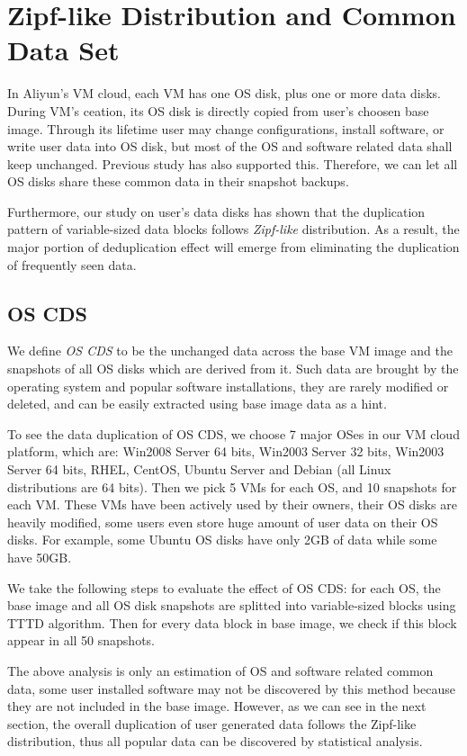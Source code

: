\section{Zipf-like Distribution and Common Data Set}
In Aliyun's VM cloud, each VM has one OS disk, plus one or more data disks.
During VM's ceation, its OS disk is directly copied from user's choosen base image.
Through its lifetime user may change configurations, install software, or write user data into OS disk,
but most of the OS and software related data shall keep unchanged. 
Previous study has also supported this\cite{vmimage}. Therefore, we can let all OS disks share these
common data in their snapshot backups.

Furthermore, our study on user's data disks has shown that the duplication pattern of
variable-sized data blocks follows \emph{Zipf-like} distribution. As a result, the major portion of 
deduplication effect will emerge from eliminating the duplication of frequently seen data.
\subsection{OS CDS}
We define \emph{OS CDS} to be the unchanged data across the base VM image and the snapshots of all
OS disks which are derived from it. Such data are brought by the operating system and popular 
software installations, they are rarely modified or deleted, and can be easily extracted using 
base image data as a hint.

To see the data duplication of OS CDS, we choose 7 major OSes in our VM cloud platform, which are:
Win2008 Server 64 bits, Win2003 Server 32 bits, Win2003 Server 64 bits, RHEL, CentOS, Ubuntu Server and Debian (all Linux
distributions are 64 bits).
Then we pick 5 VMs for each OS, and 10 snapshots for each VM. These VMs have been actively used by their
owners, their OS disks are heavily modified, some users even store huge amount of user data on
their OS disks. For example, some Ubuntu OS disks have only 2GB of data while some have 50GB.

We take the following steps to evaluate the effect of OS CDS: for each OS, the base image and all OS
disk snapshots are splitted into variable-sized blocks using TTTD algorithm. Then for every data block
in base image, we check if this block appear in all 50 snapshots. 


The above analysis is only an estimation of OS and software related common data, 
some user installed software may not be discovered by this method because they are not included in the
base image. However, as we can see in the next section, the overall duplication of user generated data
follows the Zipf-like distribution, thus all popular data can be discovered by statistical analysis.

